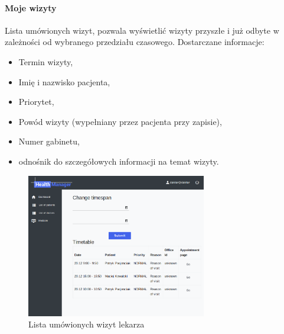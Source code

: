 \documentclass[polish,12pt]{aghthesis}
\begin{document}
    \paragraph{Moje wizyty}{Lista umówionych wizyt, pozwala wyświetlić wizyty przyszłe i już odbyte w zależności od wybranego przedziału czasowego. Dostarczane informacje:
    \begin{itemize}
        \item Termin wizyty,
        \item Imię i nazwisko pacjenta,
        \item Priorytet,
        \item Powód wizyty (wypełniany przez pacjenta przy zapisie),
        \item Numer gabinetu,
        \item odnośnik do szczegółowych informacji na temat wizyty.
    \end{itemize}
        \begin{figure}[H]
        \includegraphics[width=0.7\textwidth]{gui-doc-myvisits}
        \caption{Lista umówionych wizyt lekarza}
        \end{figure}    
    }
\end{document}
